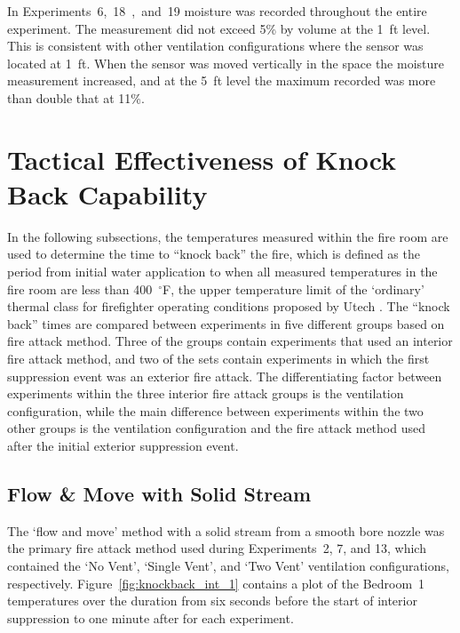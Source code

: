 \documentclass[12pt,oneside]{book}
\begin{document}
In Experiments~6,~18~,~and~19 moisture was recorded throughout the entire experiment. The measurement did not exceed 5\% by volume at the 1~ft level. This is consistent with other ventilation configurations where the sensor was located at 1~ft.  When the sensor was moved vertically in the space the moisture measurement increased, and at the 5~ft level the maximum recorded was more than double that at 11\%.   

\section{Tactical Effectiveness of Knock Back Capability}
In the following subsections, the temperatures measured within the fire room are used to determine the time to ``knock back'' the fire, which is defined as the period from initial water application to when all measured temperatures in the fire room are less than 400~$^\circ$F, the upper temperature limit of the `ordinary' thermal class for firefighter operating conditions proposed by Utech \cite{Utech_Firefighter_Clothing}. The ``knock back'' times are compared between experiments in five different groups based on fire attack method. Three of the groups contain experiments that used an interior fire attack method, and two of the sets contain experiments in which the first suppression event was an exterior fire attack. The differentiating factor between experiments within the three interior fire attack groups is the ventilation configuration, while the main difference between experiments within the two other groups is the ventilation configuration and the fire attack method used after the initial exterior suppression event.

\subsection{Flow \& Move with Solid Stream}
The `flow and move' method with a solid stream from a smooth bore nozzle was the primary fire attack method used during Experiments~2, 7, and 13, which contained the `No Vent', `Single Vent', and `Two Vent' ventilation configurations, respectively. Figure~\ref{fig:knockback_int_1} contains a plot of the Bedroom~1 temperatures over the duration from six seconds before the start of interior suppression to one minute after for each experiment.
\end{document}
